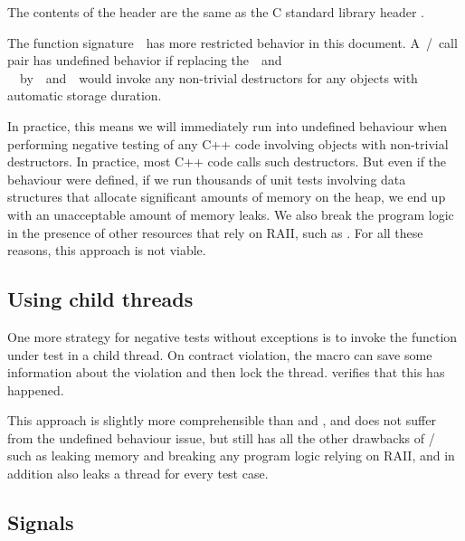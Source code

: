 \begin{adjustwidth}{0.5cm}{0.5cm}
The contents of the header  are the same as the C standard library header .

The function signature  has more restricted behavior in this document. A / call pair has undefined behavior if replacing the  and \\  by  and  would invoke any non-trivial destructors for any objects with automatic storage duration.
\end{adjustwidth}

In practice, this means we will immediately run into undefined behaviour when performing negative testing of any C++ code involving objects with non-trivial destructors. In practice, most C++ code calls such destructors. But even if the behaviour were defined, if we run thousands of unit tests involving data structures that allocate significant amounts of memory on the heap, we end up with an unacceptable amount of memory leaks. We also break the program logic in the presence of other resources that rely on RAII, such as . For all these reasons, this approach is not viable.

\subsection{Using child threads}

One more strategy for negative tests without exceptions is to invoke the function under test in a child thread. On contract violation, the  macro can save some information about the violation and then lock the thread.  verifies that this has happened.

This approach is slightly more comprehensible than  and , and does not suffer from the undefined behaviour issue, but still has all the other drawbacks of / such as leaking memory and breaking any program logic relying on RAII, and in addition also leaks a thread for every test case.


\subsection{Signals}

